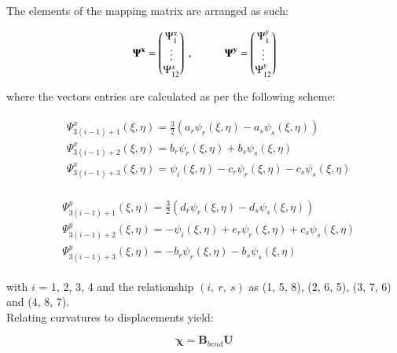 The elements of the mapping matrix are arranged as such:

\begin{equation} 
\mathbf{\Psi^x} = 
\begin{pmatrix}
\Psi_1^x \\
\vdots \\
\Psi_{12}^x
\end{pmatrix}\ ,
\hspace{10mm}
\mathbf{\Psi^y} = 
\begin{pmatrix}
\Psi_1^y \\
\vdots \\
\Psi_{12}^y
\end{pmatrix}
\label{equation24}
\end{equation}

where the vectors entries are calculated as per the following scheme:

\begin{gather} 
	\begin{aligned}
		&\Psi_{3(i-1)+1}^x (\xi , \eta) = \frac{3}{2} (a_r \psi_r (\xi , \eta) - a_s \psi_s (\xi , \eta) ) \\
		&\Psi_{3(i-1)+2}^x (\xi , \eta) = b_r \psi_r (\xi , \eta) + b_s \psi_s (\xi , \eta) \\
		&\Psi_{3(i-1)+3}^x (\xi , \eta) = \psi_i (\xi , \eta) - c_r \psi_r (\xi , \eta) - c_s \psi_s (\xi , \eta)
		\label{equation25}
	\end{aligned}
\end{gather}

\begin{gather} 
	\begin{aligned}
		&\Psi_{3(i-1)+1}^y (\xi , \eta) = \frac{3}{2} (d_r \psi_r (\xi , \eta) - d_s \psi_s (\xi , \eta) ) \\
		&\Psi_{3(i-1)+2}^y (\xi , \eta) = -\psi_i (\xi , \eta) + e_r \psi_r (\xi , \eta) + c_s \psi_s (\xi , \eta) \\
		&\Psi_{3(i-1)+3}^y (\xi , \eta) = -b_r \psi_r (\xi , \eta) - b_s \psi_s (\xi , \eta)
		\label{equation26}
	\end{aligned}
\end{gather}

with $i$ = 1, 2, 3, 4 and the relationship $(i,\ r,\ s)$ as (1, 5, 8), (2, 6, 5), (3, 7, 6) and (4, 8, 7).\\

Relating curvatures to displacements yield:

\begin{equation} 
\boldsymbol{\chi} = \mathbf{B}_{bend} \mathbf{U}
\label{equation27}
\end{equation}

